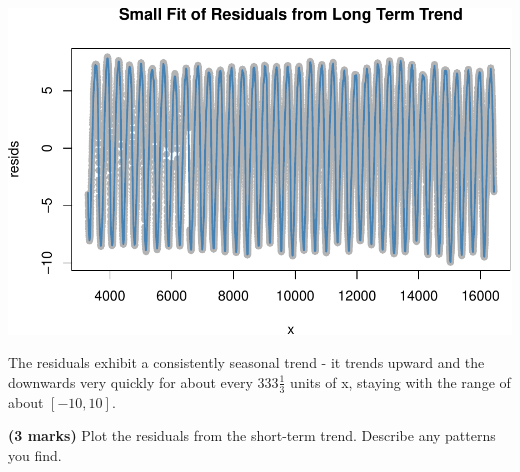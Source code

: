 \documentclass[9pt,letter]{article}
\newenvironment{Shaded}{\begin{snugshade}}{\end{snugshade}}
\newcommand{\KeywordTok}[1]{\textcolor[rgb]{0.13,0.29,0.53}{\textbf{#1}}}
\newcommand{\DataTypeTok}[1]{\textcolor[rgb]{0.13,0.29,0.53}{#1}}
\newcommand{\DecValTok}[1]{\textcolor[rgb]{0.00,0.00,0.81}{#1}}
\newcommand{\StringTok}[1]{\textcolor[rgb]{0.31,0.60,0.02}{#1}}
\newcommand{\OperatorTok}[1]{\textcolor[rgb]{0.81,0.36,0.00}{\textbf{#1}}}
\newcommand{\NormalTok}[1]{#1}
\begin{document}
\begin{Shaded}
\end{Shaded}

\begin{center}\includegraphics{a4_q3_files/figure-latex/unnamed-chunk-7-1} \end{center}

The residuals exhibit a consistently seasonal trend - it trends upward
and the downwards very quickly for about every \(333\frac{1}{3}\) units
of x, staying with the range of about \([-10, 10]\).

\item 

\textbf{(3 marks)} Plot the residuals from the short-term trend.
Describe any patterns you find.
\end{document}
